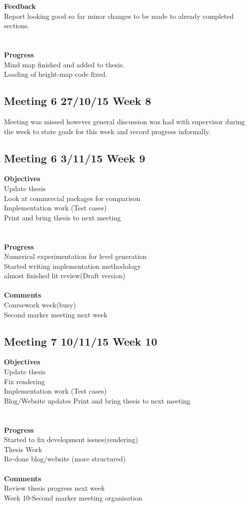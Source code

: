 \textbf{Feedback}\\
Report looking good so far minor changes to be made to already completed sections.\\
\\\\\textbf{Progress}\\
Mind map finished and added to thesis.\\
Loading of height-map code fixed. 

\subsection{Meeting 6 27/10/15 Week 8}
Meeting was missed however general discussion was had with supervisor during the week to state goals for this week and record progress informally. 

\subsection{Meeting 6 3/11/15 Week 9}

\textbf{Objectives}\\
Update thesis\\
Look at commercial packages for comparison\\
Implementation work (Test cases)\\
Print and bring thesis to next meeting \\
\\\\\textbf{Progress}\\
Numerical experimentation for level generation\\
Started writing implementation methodology\\
almost finished lit review(Draft version)\\\\\textbf{Comments}\\
Coursework week(busy)\\
Second marker meeting next week

\subsection{Meeting 7 10/11/15 Week 10}

\textbf{Objectives}\\
Update thesis\\
Fix rendering\\
Implementation work (Test cases)\\
Blog/Website updates
Print and bring thesis to next meeting \\
\\\\\textbf{Progress}\\
Started to fix development issues(rendering)\\
Thesis Work\\
Re-done blog/website (more structured)
\\\\\textbf{Comments}\\
Review thesis progress next week\\
Week 10-Second marker meeting organisation  